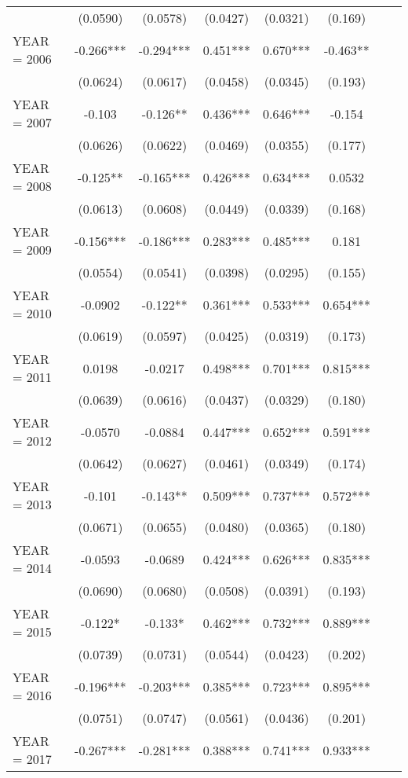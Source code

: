 \begin{tabular}{lccccccc}
 & (0.0590) & (0.0578) & (0.0427) & (0.0321) & (0.169) &  &  \\
YEAR = 2006 & -0.266*** & -0.294*** & 0.451*** & 0.670*** & -0.463** &  &  \\
 & (0.0624) & (0.0617) & (0.0458) & (0.0345) & (0.193) &  &  \\
YEAR = 2007 & -0.103 & -0.126** & 0.436*** & 0.646*** & -0.154 &  &  \\
 & (0.0626) & (0.0622) & (0.0469) & (0.0355) & (0.177) &  &  \\
YEAR = 2008 & -0.125** & -0.165*** & 0.426*** & 0.634*** & 0.0532 &  &  \\
 & (0.0613) & (0.0608) & (0.0449) & (0.0339) & (0.168) &  &  \\
YEAR = 2009 & -0.156*** & -0.186*** & 0.283*** & 0.485*** & 0.181 &  &  \\
 & (0.0554) & (0.0541) & (0.0398) & (0.0295) & (0.155) &  &  \\
YEAR = 2010 & -0.0902 & -0.122** & 0.361*** & 0.533*** & 0.654*** &  &  \\
 & (0.0619) & (0.0597) & (0.0425) & (0.0319) & (0.173) &  &  \\
YEAR = 2011 & 0.0198 & -0.0217 & 0.498*** & 0.701*** & 0.815*** &  &  \\
 & (0.0639) & (0.0616) & (0.0437) & (0.0329) & (0.180) &  &  \\
YEAR = 2012 & -0.0570 & -0.0884 & 0.447*** & 0.652*** & 0.591*** &  &  \\
 & (0.0642) & (0.0627) & (0.0461) & (0.0349) & (0.174) &  &  \\
YEAR = 2013 & -0.101 & -0.143** & 0.509*** & 0.737*** & 0.572*** &  &  \\
 & (0.0671) & (0.0655) & (0.0480) & (0.0365) & (0.180) &  &  \\
YEAR = 2014 & -0.0593 & -0.0689 & 0.424*** & 0.626*** & 0.835*** &  &  \\
 & (0.0690) & (0.0680) & (0.0508) & (0.0391) & (0.193) &  &  \\
YEAR = 2015 & -0.122* & -0.133* & 0.462*** & 0.732*** & 0.889*** &  &  \\
 & (0.0739) & (0.0731) & (0.0544) & (0.0423) & (0.202) &  &  \\
YEAR = 2016 & -0.196*** & -0.203*** & 0.385*** & 0.723*** & 0.895*** &  &  \\
 & (0.0751) & (0.0747) & (0.0561) & (0.0436) & (0.201) &  &  \\
YEAR = 2017 & -0.267*** & -0.281*** & 0.388*** & 0.741*** & 0.933*** &  &  \\

\end{tabular}
